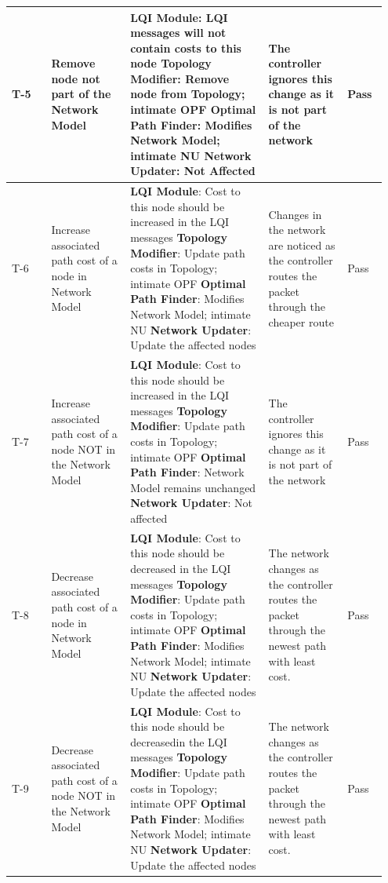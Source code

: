 \documentclass{article}
\begin{document}
{\begin{longtable}{  | p{0.1\linewidth} | p{0.2\linewidth} | p{0.35\linewidth} | p{0.2\linewidth} | p{0.1\linewidth} | }
\hline
T-5 & 
Remove node not part of the Network Model & 
\textbf{LQI Module}: LQI messages will not contain costs to this node\newline 
\textbf{Topology Modifier}: Remove node from Topology; intimate OPF\newline 
\textbf{Optimal Path Finder}: Modifies Network Model; intimate NU\newline
\textbf{Network Updater}: Not Affected &
The controller ignores this change as it is not part of the network &
Pass\\
\hline
T-6 & 
Increase associated path cost of a node in Network Model & 
\textbf{LQI Module}:  Cost to this node should be increased in the LQI messages\newline 
\textbf{Topology Modifier}: Update path costs in Topology; intimate OPF\newline 
\textbf{Optimal Path Finder}: Modifies Network Model; intimate NU\newline
\textbf{Network Updater}: Update the affected nodes &
Changes in the network are noticed as the controller routes the packet through the cheaper route &
Pass\\
\hline
T-7 & 
Increase associated path cost of a node NOT in the Network Model & 
\textbf{LQI Module}: Cost to this node should be increased in the LQI messages\newline 
\textbf{Topology Modifier}: Update path costs in Topology; intimate OPF\newline 
\textbf{Optimal Path Finder}: Network Model remains unchanged\newline
\textbf{Network Updater}: Not affected &
The controller ignores this change as it is not part of the network &
Pass\\
\hline
T-8 & 
Decrease associated path cost of a node in Network Model & 
\textbf{LQI Module}: Cost to this node should be decreased in the LQI messages\newline 
\textbf{Topology Modifier}: Update path costs in Topology; intimate OPF \newline 
\textbf{Optimal Path Finder}: Modifies Network Model; intimate NU\newline
\textbf{Network Updater}: Update the affected nodes \newline &
The network changes as the controller routes the packet through the newest path with least cost. &
Pass\\
\hline
T-9 & 
Decrease associated path cost of a node NOT in the Network Model & 
\textbf{LQI Module}: Cost to this node should be decreasedin the LQI messages\newline 
\textbf{Topology Modifier}: Update path costs in Topology; intimate OPF\newline 
\textbf{Optimal Path Finder}: Modifies Network Model; intimate NU\newline
\textbf{Network Updater}: Update the affected nodes \newline &
The network changes as the controller routes the packet through the newest path with least cost. &
Pass\\
\hline
\end{longtable}}
\end{document}
